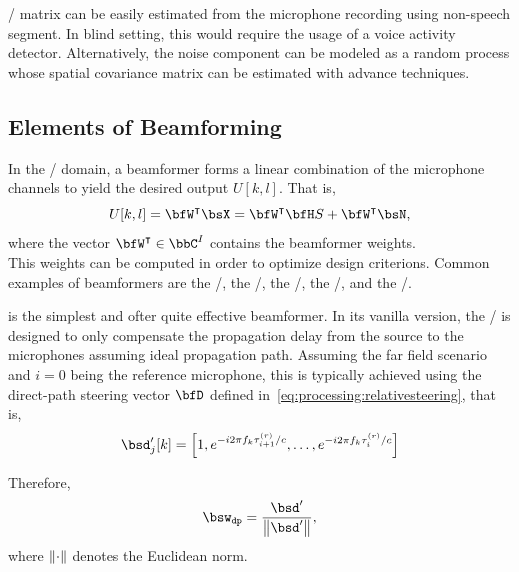  \xPSD/ matrix can be easily estimated from the microphone recording using non-speech segment.
In blind setting, this would require the usage of a voice activity detector.
Alternatively, the noise component can be modeled as a random process whose spatial covariance matrix can be estimated with advance techniques.


\subsection{Elements of Beamforming}
In the \STFT/ domain, a beamformer forms a linear combination of the microphone channels to yield the desired output $U[k,l]$.
That is,
\begin{equation*}
    U[k,l] = \ktranspose{\bfW} \MICS = \ktranspose{\bfW} \FLTSS \SRC + \ktranspose{\bfW} \NSES,
\end{equation*}
where the vector $\ktranspose{\bfW} \in \bbC^{\numMics}$ contains the beamformer weights.
\\This weights can be computed in order to optimize design criterions.
Common examples of beamformers are the \DStxt/, the \MVDRtxt/, the \MaxSNRtxt/, the \MaxSINRtxt/, and the \LCMVtxt/.


 is the simplest and ofter quite effective beamformer.
In its vanilla version, the \DS/ is designed to only compensate the propagation delay from the source to the microphones assuming ideal propagation path.
Assuming the far field scenario and $i=0$ being the reference microphone, this is typically achieved using the direct-path steering vector $\bfD$ defined in~\cref{eq:processing:relativesteering}, that is,
\begin{equation}
    \bsd'_{j}[k] = \klist{
                         1,
                         \cste^{-\csti 2 \pi f_k \tau_{i+1}^{(r)} / \speedOfSound},
                         \ldots,
                         \cste^{-\csti 2 \pi f_k \tau_{i}^{(r)} / \speedOfSound}
                    }
\end{equation}

Therefore,
\begin{equation}
    \bsw_{\mathtt{dp}} = \frac{\bsd'}{\kvvbar{\bsd'}},
\end{equation}
where $\kvvbar{\cdot}$ denotes the Euclidean norm.

